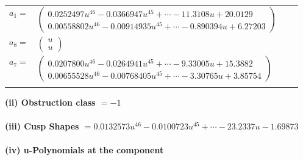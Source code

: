 \documentclass[1p]{elsarticle_modified}
\theoremstyle{definition}
\begin{document}
\begin{tabular}{m{7pt} m{180pt} m{7pt} m{180pt} }
\flushright $a_{1}=$&$\begin{pmatrix}0.0252497 u^{46}-0.0366947 u^{45}+\cdots-11.3108 u+20.0129\\0.00558802 u^{46}-0.00914935 u^{45}+\cdots-0.890394 u+6.27203\end{pmatrix}$ \\
\flushright $a_{8}=$&$\begin{pmatrix}u\\u\end{pmatrix}$ \\
\flushright $a_{7}=$&$\begin{pmatrix}0.0207800 u^{46}-0.0264941 u^{45}+\cdots-9.33005 u+15.3882\\0.00655528 u^{46}-0.00768405 u^{45}+\cdots-3.30765 u+3.85754\end{pmatrix}$\\&\end{tabular}
\flushleft \textbf{(ii) Obstruction class $= -1$}\\~\\
\flushleft \textbf{(iii) Cusp Shapes $= 0.0132573 u^{46}-0.0100723 u^{45}+\cdots-23.2337 u-1.69873$}\\~\\
\newpage\renewcommand{\arraystretch}{1}
\flushleft \textbf{(iv) u-Polynomials at the component}\newline \\
\end{document}
